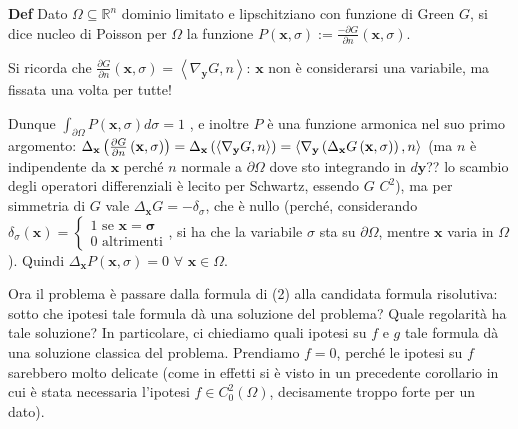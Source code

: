 \documentclass{article}
\begin{document}
\textbf{Def} Dato $\Omega \subseteq 
\mathbb{R}
^{n}$ dominio limitato e lipschitziano con funzione di Green $G$, si dice
nucleo di Poisson per $\Omega $ la funzione $P\left( \mathbf{x},\sigma
\right) :=\frac{-\partial G}{\partial n}\left( \mathbf{x},\sigma \right) $.

Si ricorda che $\frac{\partial G}{\partial n}\left( \mathbf{x},\sigma
\right) =\left\langle \nabla _{\mathbf{y}}G,n\right\rangle $: $\mathbf{x}$
non \`{e} considerarsi una variabile, ma fissata una volta per tutte!

Dunque $\int_{\partial \Omega }P\left( \mathbf{x},\sigma \right) d\sigma =1$%
, e inoltre $P$ \`{e} una funzione armonica nel suo primo argomento: $\Delta
_{\mathbf{x}}\left( \frac{\partial G}{\partial n}\left( \mathbf{x},\sigma
\right) \right) =\Delta _{\mathbf{x}}\left( \left\langle \nabla _{\mathbf{y}%
}G,n\right\rangle \right) =\left\langle \nabla _{\mathbf{y}}\left( \Delta _{%
\mathbf{x}}G\left( \mathbf{x},\sigma \right) \right) ,n\right\rangle $ (ma $%
n $ \`{e} indipendente da $\mathbf{x}$ perch\'{e} $n$ normale a $\partial
\Omega $ dove sto integrando in $d\mathbf{y}$?? lo scambio degli operatori
differenziali \`{e} lecito per Schwartz, essendo $G$ $C^{2}$), ma per
simmetria di $G$ vale $\Delta _{\mathbf{x}}G=-\delta _{\sigma }$, che \`{e}
nullo (perch\'{e}, considerando $\delta _{\sigma }\left( \mathbf{x}\right)
=\left\{ 
\begin{array}{c}
1\text{ se }\mathbf{x=\sigma } \\ 
0\text{ altrimenti}%
\end{array}%
\right. $, si ha che la variabile $\sigma $ sta su $\partial \Omega $,
mentre $\mathbf{x}$ varia in $\Omega $). Quindi $\Delta _{\mathbf{x}}P\left( 
\mathbf{x},\sigma \right) =0$ $\forall $ $\mathbf{x}\in \Omega $.

Ora il problema \`{e} passare dalla formula di (2) alla candidata formula
risolutiva: sotto che ipotesi tale formula d\`{a} una soluzione del
problema? Quale regolarit\`{a} ha tale soluzione? In particolare, ci
chiediamo quali ipotesi su $f$ e $g$ tale formula d\`{a} una soluzione
classica del problema. Prendiamo $f=0$, perch\'{e} le ipotesi su $f$
sarebbero molto delicate (come in effetti si \`{e} visto in un precedente
corollario in cui \`{e} stata necessaria l'ipotesi $f\in C_{0}^{2}\left(
\Omega \right) $, decisamente troppo forte per un dato).
\end{document}
